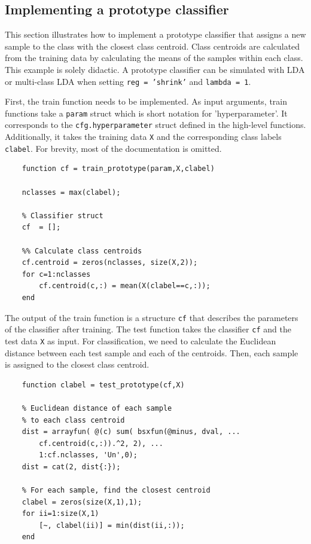 \documentclass[utf8]{frontiersSCNS} %
\newcommand{\ttt}[1]{\texttt{#1}}
\begin{document}
\subsection{Implementing a prototype classifier}

This section illustrates how to implement a prototype classifier that assigns a new sample to the class with the closest class centroid. Class centroids are calculated from the training data by calculating the means of the samples within each class. This example is solely didactic. A prototype classifier can be simulated with LDA or multi-class LDA when setting \ttt{reg = 'shrink'} and \ttt{lambda = 1}.

First, the train function needs to be implemented. As input arguments, train functions take a \ttt{param} struct which is short notation for 'hyperparameter'. It corresponds to the \ttt{cfg.hyperparameter} struct defined in the high-level functions. Additionally, it takes the training data \ttt{X} and the corresponding class labels \ttt{clabel}. For brevity, most of the documentation is omitted.

\begin{verbatim}
    function cf = train_prototype(param,X,clabel)

    nclasses = max(clabel);

    % Classifier struct
    cf  = [];

    %% Calculate class centroids
    cf.centroid = zeros(nclasses, size(X,2));
    for c=1:nclasses
        cf.centroid(c,:) = mean(X(clabel==c,:));
    end
\end{verbatim}

The output of the train function is a structure \ttt{cf} that describes the parameters of the classifier after training. The test function takes the classifier \ttt{cf} and the test data \ttt{X} as input. For classification, we need to calculate the Euclidean distance between each test sample and each of the centroids. Then, each sample is assigned to the closest class centroid.

\begin{verbatim}
    function clabel = test_prototype(cf,X)

    % Euclidean distance of each sample 
    % to each class centroid
    dist = arrayfun( @(c) sum( bsxfun(@minus, dval, ...
        cf.centroid(c,:)).^2, 2), ...
        1:cf.nclasses, 'Un',0);
    dist = cat(2, dist{:});

    % For each sample, find the closest centroid
    clabel = zeros(size(X,1),1);
    for ii=1:size(X,1)
        [~, clabel(ii)] = min(dist(ii,:));
    end

\end{verbatim}
\end{document}
